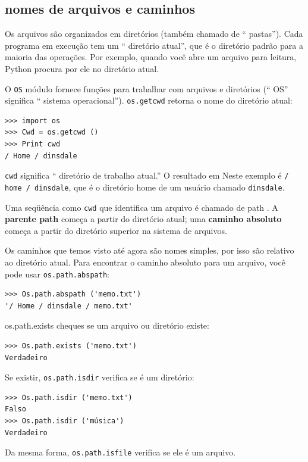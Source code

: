 \documentclass[10pt]{book}
\begin{document}
\begin{v erbatim}
\section{nomes de arquivos e caminhos}
\label{caminhos}

Os arquivos são organizados em diretórios {\bf} (também chamado de `` pastas'').
Cada programa em execução tem um `` diretório atual'', que é o
diretório padrão para a maioria das operações.  
Por exemplo, quando você abre um arquivo para leitura, Python procura por ele no
diretório atual.

O {\tt OS} módulo fornece funções para trabalhar com arquivos e
diretórios (`` OS'' significa `` sistema operacional''). {\tt os.getcwd}
retorna o nome do diretório atual:

\begin{verbatim}
>>> import os
>>> Cwd = os.getcwd ()
>>> Print cwd
/ Home / dinsdale
\end{verbatim}
%
{\tt cwd} significa `` diretório de trabalho atual.'' O resultado em
Neste exemplo é {\tt / home / dinsdale}, que é o diretório home de um
usuário chamado {\tt dinsdale}.

Uma seqüência como {\tt cwd} que identifica um arquivo é chamado de {path \bf}.
A {\bf parente path} começa a partir do diretório atual;
uma {\bf caminho absoluto} começa a partir do diretório superior na
sistema de arquivos.

Os caminhos que temos visto até agora são nomes simples, por isso são
relativo ao diretório atual. Para encontrar o caminho absoluto para
um arquivo, você pode usar {\tt os.path.abspath}:

\begin{verbatim}
>>> Os.path.abspath ('memo.txt')
'/ Home / dinsdale / memo.txt'
\end{verbatim}
%
{os.path.exists \tt} cheques
se um arquivo ou diretório existe:

\begin{verbatim}
>>> Os.path.exists ('memo.txt')
Verdadeiro
\end{verbatim}
%
Se existir, {\tt os.path.isdir} verifica se é um diretório:

\begin{verbatim}
>>> Os.path.isdir ('memo.txt')
Falso
>>> Os.path.isdir ('música')
Verdadeiro
\end{verbatim}
%
Da mesma forma, {\tt os.path.isfile} verifica se ele é um arquivo.


\end{v erbatim}
\end{document}
